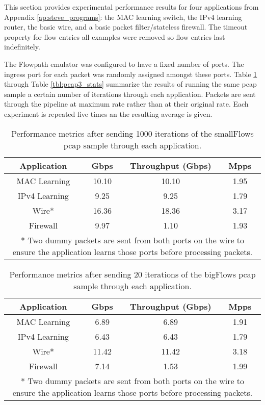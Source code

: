 This section provides experimental performance results for four applications from Appendix \ref{ap:steve_programs}: the MAC learning switch, the IPv4 learning router, the basic wire, and a basic packet filter/stateless firewall. The timeout property for flow entries all examples were removed so flow entries last indefinitely.

The Flowpath emulator was configured to have a fixed number of ports. The ingress port for each packet was randomly assigned amongst these ports. Table \ref{tbl:pcap1_stats} through Table \ref{tbl:pcap3_stats} summarize the results of running the same pcap sample a certain number of iterations through each application. Packets are sent through the pipeline at maximum rate rather than at their original rate. Each experiment is repeated five times an the resulting average is given.

\begin{table}
\caption{Performance metrics after sending 1000 iterations of the smallFlows pcap sample through each application.}
\begin{center}
\begin{tabular}{| c || c | c | c | }
\hline
Application & Gbps & Throughput (Gbps) & Mpps  \\
\hline
MAC Learning & 10.10 & 10.10 & 1.95  \\
\hline
IPv4 Learning & 9.25 & 9.25 & 1.79  \\
\hline 
Wire* & 16.36 & 18.36 & 3.17 \\
\hline
Firewall & 9.97 & 1.10 & 1.93 \\
\hline
\multicolumn{4}{p{\linewidth}}{* Two dummy packets are sent from both ports on the wire to ensure the application learns those ports before processing packets.}
\end{tabular}
\end{center}
\label{tbl:pcap1_stats}
\end{table}


\begin{table}
\caption{Performance metrics after sending 20 iterations of the bigFlows pcap sample through each application.}
\begin{center}
\begin{tabular}{| c || c | c | c | }
\hline
Application & Gbps & Throughput (Gbps) & Mpps  \\
\hline
MAC Learning & 6.89 & 6.89 & 1.91  \\
\hline
IPv4 Learning & 6.43 & 6.43 & 1.79  \\
\hline 
Wire* & 11.42 & 11.42 & 3.18 \\
\hline
Firewall & 7.14 & 1.53 & 1.99 \\
\hline
\multicolumn{4}{p{\linewidth}}{* Two dummy packets are sent from both ports on the wire to ensure the application learns those ports before processing packets.}
\end{tabular}
\end{center}
\label{tbl:pcap2_stats}
\end{table}

